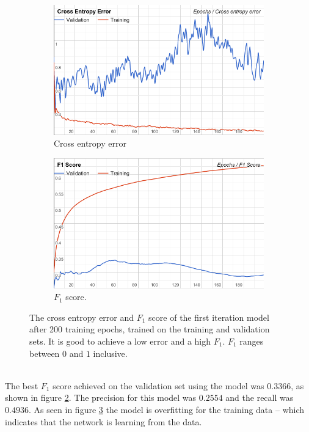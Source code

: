 \begin{figure}[h!]
\begin{subfigure}{0.5\textwidth}
\includegraphics[width=1 \linewidth]{figure/results/first_iter_cross}
\caption{Cross entropy error}
\label{fig:first_iter_overfitting}
\end{subfigure}
\begin{subfigure}{0.5\textwidth}
\includegraphics[width=1\linewidth]{figure/results/first_iter_f1}
\caption{$F_1$ score.}
\label{fig:first_iter_f1}
\end{subfigure}
 
\caption{The cross entropy error and $F_1$ score of the first iteration model after 200 training epochs, trained on the training and validation sets. It is good to achieve a low error and a high $F_1$. $F_1$ ranges between $0$ and $1$ inclusive.}
\label{fig:first_iter}
\end{figure}
\\
The best $F_1$ score achieved on the validation set using the model was $0.3366$, as shown in figure \ref{fig:first_iter_f1}. The precision for this model was $0.2554$ and the recall was $0.4936$. As seen in figure \ref{fig:first_iter} the model is overfitting for the training data -- which indicates that the network is learning from the data.
